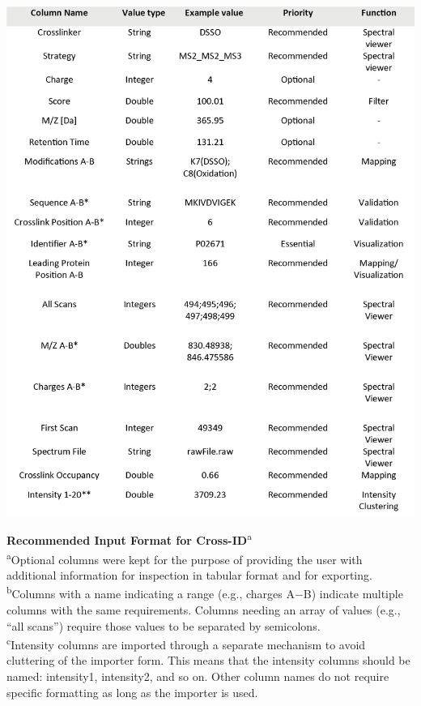 \begin{table}[!htb]
  \center
  \includegraphics[]{Chapter.2/Figures/t2.png}
  \caption{
    \textbf{Recommended Input Format for Cross-ID}\textsuperscript{a}\\
    \textsuperscript{a}Optional columns were kept for the purpose of providing the user with additional information for inspection in tabular format and for exporting.\\
    \textsuperscript{b}Columns with a name indicating a range (e.g., charges A−B) indicate multiple columns with the same requirements. Columns needing an array of values (e.g., “all scans”) require those values to be separated by semicolons.\\
    \textsuperscript{c}Intensity columns are imported through a separate mechanism to avoid cluttering of the importer form. This means that the intensity columns should be named: intensity1, intensity2, and so on. Other column names do not require specific formatting as long as the importer is used.
  }
  \label{tab:tab2.2}
\end{table}

